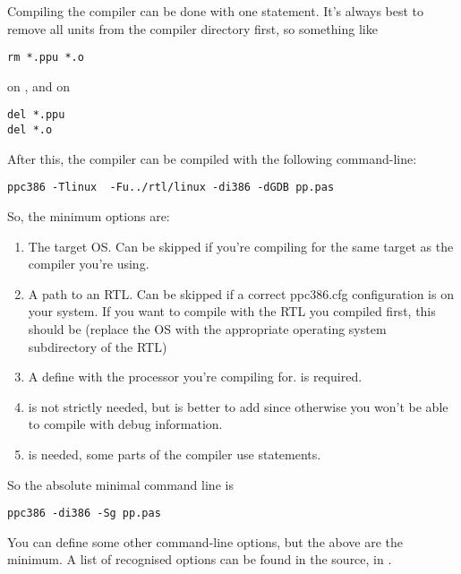 \documentclass{report}
\begin{document}
Compiling the compiler can be done with one statement. It's always best to
remove all units from the compiler directory first, so something like
\begin{verbatim}
rm *.ppu *.o
\end{verbatim}
on \linux, and on \dos
\begin{verbatim}
del *.ppu
del *.o
\end{verbatim}
After this, the compiler can be compiled with the following command-line:
\begin{verbatim}
ppc386 -Tlinux  -Fu../rtl/linux -di386 -dGDB pp.pas
\end{verbatim}
So, the minimum options are:
\begin{enumerate}
\item The target OS. Can be skipped if you're compiling for the same target as
the compiler you're using.
\item A path to an RTL. Can be skipped if a correct ppc386.cfg configuration
is on your system. If you want to compile with the RTL you compiled first,
this should be  (replace the OS with the appropriate
operating system subdirectory of the RTL)
\item A define with the processor you're compiling for. is required.
\item {} is not strictly needed, but is better to add since
otherwise you won't be able to compile with debug information.
\item {} is needed, some parts of the compiler use 
statements.
\end{enumerate}
So the absolute minimal command line is
\begin{verbatim}
ppc386 -di386 -Sg pp.pas
\end{verbatim}

You can define some other command-line options, but the above are the
minimum. A list of recognised options can be found in the source, in
.
\end{document}
